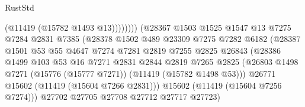 \begin{lexlean}{RustStd}
\begin{coremodule}
                                              (@11419 (@15782 @1493 @13))))))))
                                  (@28367
                                    @1503
                                    @1525
                                    @1547
                                    @13
                                    @7275
                                    @7284
                                    @2831
                                    @7385
                                    (@28378
                                      @1502
                                      @489
                                      @23309
                                      @7275
                                      @7282
                                      @6182
                                      (@28387
                                        @1501
                                        @53
                                        @55
                                        @4647
                                        @7274
                                        @7281
                                        @2819
                                        @7255
                                        @2825
                                        @26843
                                        (@28386
                                          @1499
                                          @103
                                          @53
                                          @16
                                          @7271
                                          @2831
                                          @2844
                                          @2819
                                          @7265
                                          @2825
                                          (@26803
                                            @1498
                                            @7271
                                            (@15776 (@15777 @7271))
                                            (@11419 (@15782 @1498 @53)))
                                          @26771
                                          @15602
                                          (@11419 (@15604 @7266 @2831)))
                                        @15602
                                        (@11419 (@15604 @7256 @7274)))
                                      @27702
                                      @27705
                                      @27708
                                      @27712
                                      @27717
                                      @27723)

\end{coremodule}
\end{lexlean}

